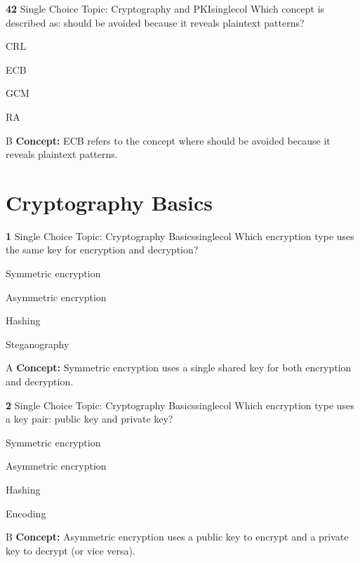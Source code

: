 \documentclass[10pt,a4paper]{article}
\begin{document}
\begin{qcard}{\color{white}\textbf{42} \hfill \small Single Choice \textbar{} Topic: Cryptography and PKI}{singlecol}
Which concept is described as: should be avoided because it reveals plaintext patterns?

\begin{qoptions}
\item CRL
\item ECB
\item GCM
\item RA
\end{qoptions}
\begin{explainbox}{B}
\textbf{Concept:} ECB refers to the concept where should be avoided because it reveals plaintext patterns.
\end{explainbox}
\end{qcard}

\section{Cryptography Basics}
\begin{qcard}{\color{white}\textbf{1} \hfill \small Single Choice \textbar{} Topic: Cryptography Basics}{singlecol}
Which encryption type uses the same key for encryption and decryption?

\begin{qoptions}
\item Symmetric encryption
\item Asymmetric encryption
\item Hashing
\item Steganography
\end{qoptions}
\begin{explainbox}{A}
\textbf{Concept:} Symmetric encryption uses a single shared key for both encryption and decryption.
\end{explainbox}
\end{qcard}

\begin{qcard}{\color{white}\textbf{2} \hfill \small Single Choice \textbar{} Topic: Cryptography Basics}{singlecol}
Which encryption type uses a key pair: public key and private key?

\begin{qoptions}
\item Symmetric encryption
\item Asymmetric encryption
\item Hashing
\item Encoding
\end{qoptions}
\begin{explainbox}{B}
\textbf{Concept:} Asymmetric encryption uses a public key to encrypt and a private key to decrypt (or vice versa).
\end{explainbox}
\end{qcard}
\end{document}
